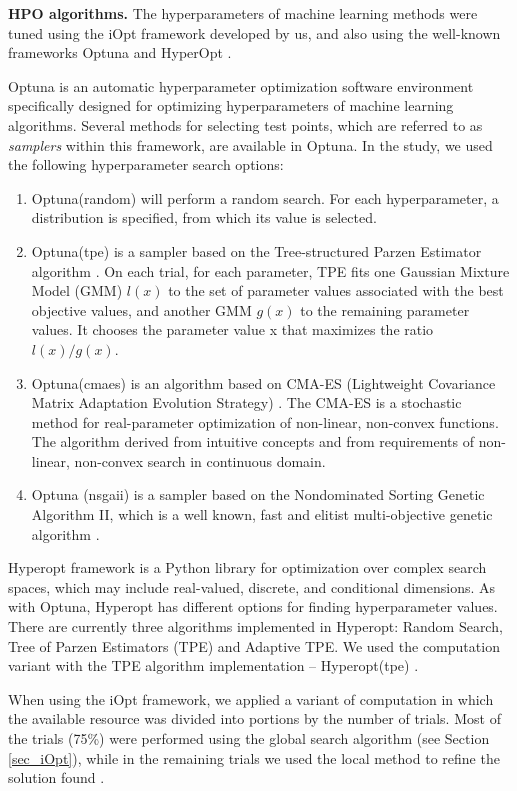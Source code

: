 \documentclass[preprint,12pt]{elsarticle}
\begin{document}
\textbf{HPO algorithms.} The hyperparameters of machine learning methods were tuned using the iOpt framework developed by us, and also using the well-known frameworks Optuna \cite{optuna} and HyperOpt \cite{hyperopt}.

Optuna is an automatic hyperparameter optimization software environment specifically designed for optimizing hyperparameters of machine learning algorithms. Several methods for selecting test points, which are referred to as \textit{samplers} within this framework, are available in Optuna.  In the study, we used the following hyperparameter search options:
\begin{enumerate}
	\item Optuna(random) will perform a random search. For each hyperparameter, a distribution is specified, from which its value is selected.
	\item Optuna(tpe) is a sampler based on the Tree-structured Parzen Estimator algorithm \cite{NIPS2011_86e8f7ab}. On each trial, for each parameter, TPE fits one Gaussian Mixture Model (GMM) $l(x)$ to the set of parameter values associated with the best objective values, and another GMM $g(x)$ to the remaining parameter values. It chooses the parameter value x that maximizes the ratio $l(x)/g(x)$.
	\item Optuna(cmaes) is an algorithm based on CMA-ES (Lightweight Covariance Matrix Adaptation Evolution Strategy) \cite{cmaes2015}. The CMA-ES is a stochastic method for real-parameter optimization of non-linear, non-convex functions. The algorithm derived from intuitive concepts and from requirements of non-linear, non-convex search in continuous domain.
	\item Optuna (nsgaii) is a sampler based on the Nondominated Sorting Genetic Algorithm II,  which is a well known, fast and elitist multi-objective genetic algorithm \cite{nsgaii2013}.

\end{enumerate}


Hyperopt framework is a Python library for optimization over complex search spaces, which may include real-valued, discrete, and conditional dimensions. As with Optuna, Hyperopt has different options for finding hyperparameter values. There are currently three algorithms implemented in Hyperopt: Random Search, Tree of Parzen Estimators (TPE) and Adaptive TPE. We used the computation variant with the TPE algorithm implementation -- Hyperopt(tpe) \cite{NIPS2011_86e8f7ab}.

When using the iOpt framework, we applied a variant of computation in which the available resource was divided into portions by the number of trials. Most of the trials (75\%) were performed using the global search algorithm (see Section \ref{sec_iOpt}), while in the remaining trials we used the local method to refine the solution found \cite{Kelley}.
\end{document}
